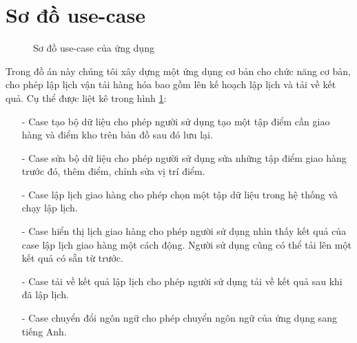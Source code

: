 \documentclass[a4paper,12pt]{report}
\begin{document}
\section{Sơ đồ use-case}
\begin{figure}[H]

\begin{center}
\end{center}
\caption{Sơ đồ use-case của ứng dụng}
\label{usecase}

\end{figure}
Trong đồ án này chúng tôi xây dựng một ứng dụng cơ bản cho chức năng cơ bản, cho phép lập lịch vận tải hàng hóa bao gồm lên kế hoạch lập lịch và tải về kết quả. Cụ thể được liệt kê trong hình \ref{usecase}:
\begin{itemize}
\item[-] Case tạo bộ dữ liệu cho phép người sử dụng tạo một tập điểm cần giao hàng và điểm kho trên bản đồ sau đó lưu lại.
\item[-] Case sửa bộ dữ liệu cho phép người sử dụng sửa những tập điểm giao hàng trước đó, thêm điểm, chỉnh sửa vị trí điểm.
\item[-] Case lập lịch giao  hàng cho phép chọn một tập dữ liệu trong hệ thống và chạy lập lịch.
\item[-] Case hiển thị lịch giao hàng cho phép người sử dụng nhìn thấy kết quả của case lập lịch giao hàng một cách động. Người sử dụng cũng có thể tải lên một kết quả có sẵn từ trước.
\item[-] Case tải về kết quả lập lịch cho phép người sử dụng tải về kết quả sau khi đã lập lịch. 
\item[-] Case chuyển đổi ngôn ngữ cho phép chuyển ngôn ngữ của ứng dụng sang tiếng Anh.
\end{itemize}
\end{document}
